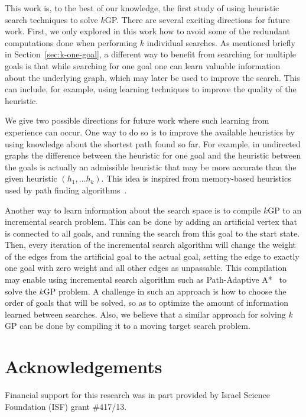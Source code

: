 \documentclass{aicom2e}
\newcommand{\kgs}{$k$GP}
\newcommand{\roni}[1]{\textbf{[RS:#1]}}
\begin{document}
This work is, to the best of our knowledge, the first study of using heuristic
search techniques to solve \kgs{}. There are several exciting directions for
future work. First, we only explored in this work how to avoid some of the
redundant computations done when performing $k$ individual searches. As
mentioned briefly in Section~\ref{sec:k-one-goal}, a different way to benefit
from searching for multiple goals is that while searching for one goal one can
learn valuable information about the underlying graph, which may later be used
to improve the search. This can include, for example, using learning techniques
to improve the quality of the heuristic.

We give two possible directions for future work where such learning from
experience can occur. One way to do so is to improve the available heuristics
by using knowledge about the shortest path found so far. For example, in
undirected graphs the difference between the heuristic for one goal and the
heuristic between the goals is actually an admissible heuristic that may be
more accurate than the given heuristic $(h_1,\ldots h_k)$. 
This idea is
inspired from memory-based heuristics used by path finding
algorithms~\cite{sturtevant2007memory,sturtevant2009memory,goldenberg2011theCompressed}.


Another way to learn information about the search space is to compile \kgs{} to
an incremental search problem. This can be done by adding an artificial vertex
that is connected to all goals, and running the search from this goal to the
start state. Then, every iteration of the incremental search algorithm will
change the weight of the edges from the artificial goal to the actual goal,
setting the edge to exactly one goal with zero weight and all other edges as
unpassable. This compilation may enable using incremental search algorithm such
as Path-Adaptive A*~\cite{hernandez2015reusing} to solve the \kgs{} problem. A
challenge in such an approach is how to choose the order of goals that will be
solved, so as to optimize the amount of information learned between searches.
Also, we believe that a similar approach for solving \kgs{} can be done by
compiling it to a moving target search problem.






\section*{Acknowledgements}

Financial support for this research was in part provided by Israel Science
Foundation (ISF) grant \#417/13.



\end{document}
